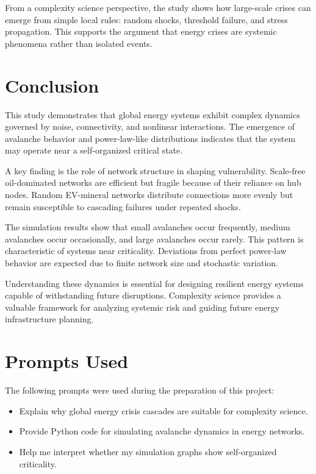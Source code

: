\documentclass[12pt]{article}
\begin{document}
From a complexity science perspective, the study shows how large-scale crises can emerge from simple local rules: random shocks, threshold failure, and stress propagation. This supports the argument that energy crises are systemic phenomena rather than isolated events.

\section{Conclusion}

This study demonstrates that global energy systems exhibit complex dynamics governed by noise, connectivity, and nonlinear interactions. The emergence of avalanche behavior and power-law-like distributions indicates that the system may operate near a self-organized critical state.

A key finding is the role of network structure in shaping vulnerability. Scale-free oil-dominated networks are efficient but fragile because of their reliance on hub nodes. Random EV-mineral networks distribute connections more evenly but remain susceptible to cascading failures under repeated shocks.

The simulation results show that small avalanches occur frequently, medium avalanches occur occasionally, and large avalanches occur rarely. This pattern is characteristic of systems near criticality. Deviations from perfect power-law behavior are expected due to finite network size and stochastic variation.

Understanding these dynamics is essential for designing resilient energy systems capable of withstanding future disruptions. Complexity science provides a valuable framework for analyzing systemic risk and guiding future energy infrastructure planning.

\section{Prompts Used}

The following prompts were used during the preparation of this project:

\begin{itemize}
    \item Explain why global energy crisis cascades are suitable for complexity science.
    \item Provide Python code for simulating avalanche dynamics in energy networks.
    \item Help me interpret whether my simulation graphs show self-organized criticality.
\end{itemize}
\end{document}

